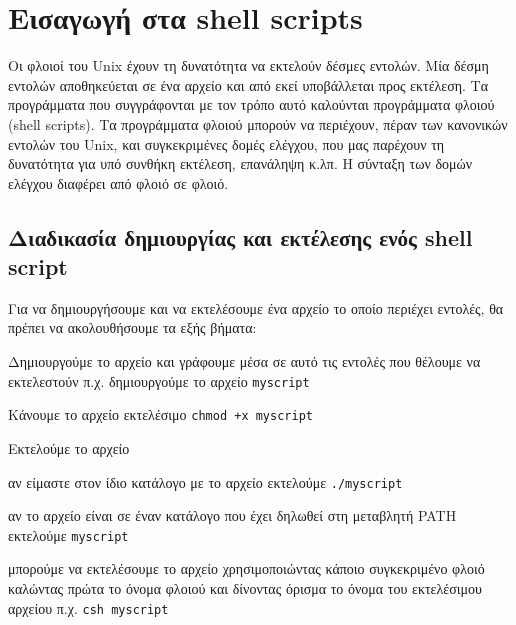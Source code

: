 



\section*{Εισαγωγή στα shell scripts}

Οι φλοιοί του Unix έχουν τη δυνατότητα να εκτελούν δέσμες εντολών. Μία δέσμη εντολών αποθηκεύεται σε ένα αρχείο και από εκεί υποβάλλεται
προς εκτέλεση. Τα προγράμματα που συγγράφονται με τον τρόπο αυτό καλούνται προγράμματα φλοιού (shell scripts). Τα προγράμματα φλοιού μπορούν
να περιέχουν, πέραν των κανονικών εντολών του Unix, και συγκεκριμένες δομές ελέγχου, που μας παρέχουν τη δυνατότητα για υπό συνθήκη
εκτέλεση, επανάληψη κ.λπ. Η σύνταξη των δομών ελέγχου διαφέρει από φλοιό σε φλοιό. 

\subsection*{Διαδικασία δημιουργίας  και εκτέλεσης ενός shell script}
Για να δημιουργήσουμε και να εκτελέσουμε ένα αρχείο το οποίο περιέχει εντολές, θα πρέπει να ακολουθήσουμε τα εξής βήματα:
\begin{packed_enum}
	\item Δημιουργούμε το αρχείο και γράφουμε μέσα σε αυτό τις εντολές που θέλουμε να εκτελεστούν π.χ. δημιουργούμε το αρχείο \texttt{myscript}
	\item Κάνουμε το αρχείο εκτελέσιμο \texttt{chmod +x myscript}
	\item Εκτελούμε το αρχείο 
	\begin{packed_item}
		\item αν είμαστε στον ίδιο κατάλογο με το αρχείο εκτελούμε \texttt{./myscript}
		\item αν το αρχείο είναι σε έναν κατάλογο που έχει δηλωθεί στη μεταβλητή PATH εκτελούμε \texttt{myscript}
		\item μπορούμε να εκτελέσουμε το αρχείο χρησιμοποιώντας κάποιο συγκεκριμένο φλοιό καλώντας πρώτα το όνομα φλοιού και δίνοντας όρισμα το
		όνομα του εκτελέσιμου αρχείου π.χ. \texttt{csh myscript}
	\end{packed_item}
\end{packed_enum}

